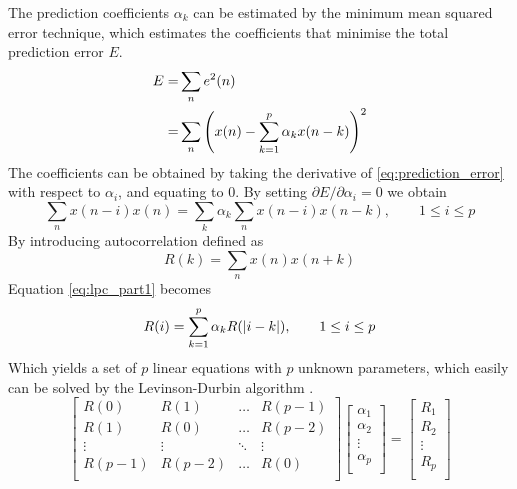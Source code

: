 The prediction coefficients $\alpha_k$ can be estimated by the minimum mean squared error technique, which estimates the coefficients that minimise the total prediction error $E$.
\begin{equation}
	\label{eq:prediction_error}
	\begin{split}
		E = & \sum_{n} e^2(n)\\
		= & \sum_{n}\left(x(n)-\sum_{k=1}^{p}\alpha_k x(n-k)\right)^2
	\end{split}
\end{equation}
The coefficients can be obtained by taking the derivative of \eqref{eq:prediction_error} with respect to $\alpha_i$, and equating to 0. By setting $\partial E/\partial \alpha_i = 0$ we obtain
\begin{equation}
	\sum_{n}x(n-i)x(n) = \sum_{k}\alpha_k \sum_{n}x(n-i)x(n-k), \qquad  1\leq i\leq p 
	\label{eq:lpc_part1}
\end{equation}	
By introducing autocorrelation defined as
\begin{equation}
	R(k) = \sum_{n} x(n) x(n+k)
\end{equation}
Equation \eqref{eq:lpc_part1} becomes
\begin{equation}
	R(i) = \sum_{k=1}^{p} \alpha_k R(\lvert i-k\rvert), \qquad  1\leq i\leq p
	\label{eq:lpc_part2}
\end{equation}
Which yields a set of $p$ linear equations with $p$ unknown parameters, which easily can be solved by \eg the Levinson-Durbin algorithm \cite{digsig,cybenko80}.
\begin{equation}
	\begin{bmatrix}
		R(0) & R(1) & \dots & R(p-1) \\
		R(1) & R(0) & \dots & R(p-2) \\
		\vdots & \vdots & \ddots & \vdots \\
		R(p-1) & R(p-2) & \dots & R(0) \\
	\end{bmatrix} 
	\begin{bmatrix}
		\alpha_1 \\
		\alpha_2 \\
		\vdots \\
		\alpha_p \\
	\end{bmatrix}
	=
	\begin{bmatrix}
		R_1 \\
		R_2 \\
		\vdots \\
		R_p \\
	\end{bmatrix}
	\label{eq:yule_walker}
\end{equation}

